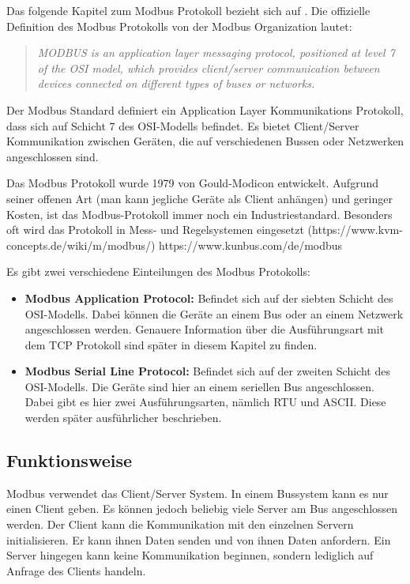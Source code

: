 Das folgende Kapitel zum Modbus Protokoll bezieht sich auf \cite{Modbus_Organization_AP:2012, Modbus_Organization_SL:2012}. \newline Die offizielle Definition des Modbus Protokolls von der Modbus Organization \cite{Modbus_Organization_AP:2012} lautet:
\begin{quotation}
	\emph{
		MODBUS is an application layer messaging protocol, positioned at level 7 of the OSI model, which provides client/server communication between devices connected on different types of buses or networks.}
\end{quotation}

Der Modbus Standard definiert ein Application Layer Kommunikations Protokoll, dass sich auf Schicht 7 des OSI-Modells befindet. Es bietet Client/Server Kommunikation zwischen Geräten, die auf verschiedenen Bussen oder Netzwerken angeschlossen sind.

Das Modbus Protokoll wurde 1979 von Gould-Modicon entwickelt. Aufgrund seiner offenen Art (man kann jegliche Geräte als Client anhängen) und geringer Kosten, ist das Modbus-Protokoll immer noch ein Industriestandard. Besonders oft wird das Protokoll in Mess- und Regelsystemen eingesetzt (https://www.kvm-concepts.de/wiki/m/modbus/)
https://www.kunbus.com/de/modbus 

Es gibt zwei verschiedene Einteilungen des Modbus Protokolls: 
\begin{itemize}
\item \textbf{Modbus Application Protocol:} Befindet sich auf der siebten Schicht des OSI-Modells. Dabei können die Geräte an einem Bus oder an einem Netzwerk angeschlossen werden. Genauere Information über die Ausführungsart mit dem TCP Protokoll sind später in diesem Kapitel zu finden.
\item \textbf{Modbus Serial Line Protocol:} Befindet sich auf der zweiten Schicht des OSI-Modells. Die Geräte sind hier an einem seriellen Bus angeschlossen. Dabei gibt es hier zwei Ausführungsarten, nämlich RTU und ASCII. Diese werden später ausführlicher beschrieben.
\end{itemize}

\subsection{Funktionsweise}
Modbus verwendet das Client/Server System. In einem Bussystem kann es nur einen Client geben. Es können jedoch beliebig viele Server am Bus angeschlossen werden. Der Client kann die Kommunikation mit den einzelnen Servern initialisieren. Er kann ihnen Daten senden und von ihnen Daten anfordern. Ein Server hingegen kann keine Kommunikation beginnen, sondern lediglich auf Anfrage des Clients handeln.

